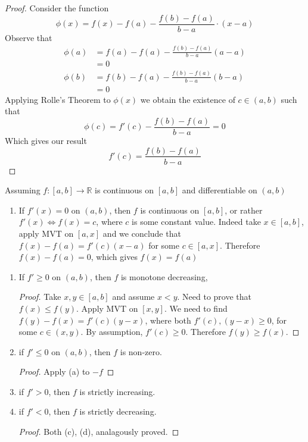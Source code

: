 \begin{proof}
Consider the function
\[
\phi (x) = f(x) - f(a) - \frac{f(b) - f(a)}{b-a}\cdot (x-a)
\]
Observe that
\begin{align*}
\phi (a) &= f(a) - f(a) - \frac{f(b) - f(a)}{b-a}(a-a) \\
         &= 0\\
         \phi (b) &= f(b) - f(a) - \frac{f(b) - f(a)}{b-a}(b-a)\\
         &= 0
\end{align*}
Applying Rolle's Theorem to \(\phi(x)\) we obtain the existence of \(c \in (a,b)\) such that
\[
\phi(c) = f'(c) - \frac{f(b) - f(a)}{b-a} = 0
\]
Which gives our result
\[
f'(c) = \frac{f(b)-f(a)}{b-a}
\]
\end{proof}
\begin{example}
Assuming \(f:[a,b] \to \mathbb{R}\) is continuous on \([a,b]\) and differentiable on \((a,b)\)
\begin{enumerate}
\item If \(f'(x) = 0\) on \((a,b)\), then \(f\) is continuous on \([a,b]\), or rather \(f'(x) \iff f(x) = c\), where \(c\) is some constant value. Indeed take \(x \in [a,b]\), apply MVT on \([a,x]\) and we conclude that \(f(x) - f(a) = f'(c)(x-a)\) for some \(c \in [a,x]\). Therefore \(f(x) - f(a) = 0\), which gives \(f(x) = f(a)\)
\end{enumerate}
\end{example}
\begin{theorem}[Properties]
\begin{enumerate}
\item If \(f' \geq 0\) on \((a,b)\), then \(f\) is monotone decreasing,
\begin{proof}
Take \(x,y \in [a,b]\) and assume \(x < y\). Need to prove that \(f(x) \leq f(y)\). Apply MVT on \([x,y]\). We need to find \(f(y) - f(x) = f'(c)(y-x)\), where both \(f'(c), (y-x) \geq 0\), for some \(c \in (x,y)\). By assumption, \(f'(c) \geq 0\). Therefore \(f(y) \geq f(x)\).
\end{proof}

\item if \(f' \leq 0\) on \((a,b)\), then \(f\) is non-zero.
\begin{proof}
Apply (a) to \(-f\)
\end{proof}

\item if \(f' > 0\), then \(f\) is strictly increasing.
\item if \(f' < 0\), then \(f\) is strictly decreasing.
\begin{proof}
Both (c), (d), analagously proved.
\end{proof}
\end{enumerate}
\end{theorem}
